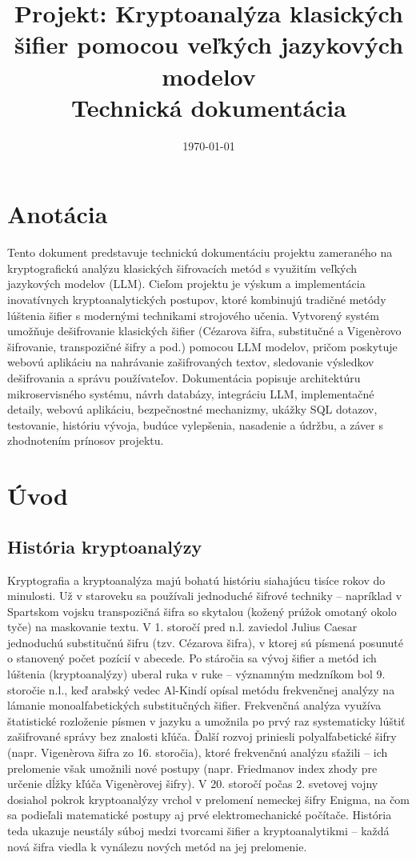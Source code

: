 \documentclass[12pt,a4paper]{article}
\title{Projekt: Kryptoanalýza klasických šifier pomocou veľkých jazykových modelov\\\large Technická dokumentácia}
\author{}
\date{\today}
\begin{document}
\maketitle

\tableofcontents
\newpage

\section{Anotácia}
Tento dokument predstavuje technickú dokumentáciu projektu zameraného na kryptografickú analýzu klasických šifrovacích metód s využitím veľkých jazykových modelov (LLM). Cieľom projektu je výskum a implementácia inovatívnych kryptoanalytických postupov, ktoré kombinujú tradičné metódy lúštenia šifier s modernými technikami strojového učenia. Vytvorený systém umožňuje dešifrovanie klasických šifier (Cézarova šifra, substitučné a Vigenèrovo šifrovanie, transpozičné šifry a pod.) pomocou LLM modelov, pričom poskytuje webovú aplikáciu na nahrávanie zašifrovaných textov, sledovanie výsledkov dešifrovania a správu používateľov. Dokumentácia popisuje architektúru mikroservisného systému, návrh databázy, integráciu LLM, implementačné detaily, webovú aplikáciu, bezpečnostné mechanizmy, ukážky SQL dotazov, testovanie, históriu vývoja, budúce vylepšenia, nasadenie a údržbu, a záver s zhodnotením prínosov projektu.

\section{Úvod}
\subsection{História kryptoanalýzy}
Kryptografia a kryptoanalýza majú bohatú históriu siahajúcu tisíce rokov do minulosti. Už v staroveku sa používali jednoduché šifrové techniky -- napríklad v Spartskom vojsku transpozičná šifra so skytalou (kožený prúžok omotaný okolo tyče) na maskovanie textu. V 1. storočí pred n.l. zaviedol Julius Caesar jednoduchú substitučnú šifru (tzv. Cézarova šifra), v ktorej sú písmená posunuté o stanovený počet pozícií v abecede. Po stáročia sa vývoj šifier a metód ich lúštenia (kryptoanalýzy) uberal ruka v ruke -- významným medzníkom bol 9. storočie n.l., keď arabský vedec Al-Kindí opísal metódu frekvenčnej analýzy na lámanie monoalfabetických substitučných šifier. Frekvenčná analýza využíva štatistické rozloženie písmen v jazyku a umožnila po prvý raz systematicky lúštiť zašifrované správy bez znalosti kľúča. Ďalší rozvoj priniesli polyalfabetické šifry (napr. Vigenèrova šifra zo 16. storočia), ktoré frekvenčnú analýzu sťažili -- ich prelomenie však umožnili nové postupy (napr. Friedmanov index zhody pre určenie dĺžky kľúča Vigenèrovej šifry). V 20. storočí počas 2. svetovej vojny dosiahol pokrok kryptoanalýzy vrchol v prelomení nemeckej šifry Enigma, na čom sa podieľali matematické postupy aj prvé elektromechanické počítače. História teda ukazuje neustály súboj medzi tvorcami šifier a kryptoanalytikmi -- každá nová šifra viedla k vynálezu nových metód na jej prelomenie.
\end{document}
